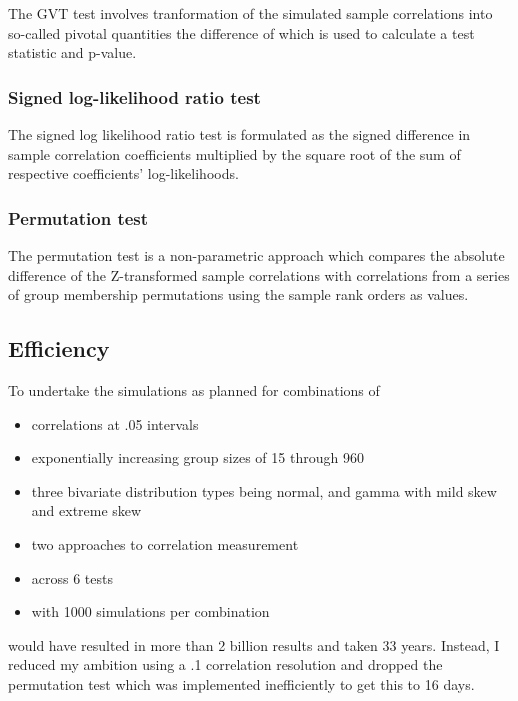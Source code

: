 The GVT test involves tranformation of the simulated sample correlations into so-called pivotal quantities the difference of which is used to calculate a test statistic and p-value.


\subsubsection{Signed log-likelihood ratio test}
The signed log likelihood ratio test is formulated as the signed difference in sample correlation coefficients multiplied by the square root of the sum of respective coefficients' log-likelihoods.


\subsubsection{Permutation test}
The permutation test is a non-parametric approach which compares the absolute difference of the Z-transformed sample correlations with correlations from a series of group membership permutations using the sample rank orders as values.

\subsection{Efficiency}
To undertake the simulations as planned for combinations of 
\begin{itemize}
  \item correlations at .05 intervals 
  \item exponentially increasing group sizes of 15 through 960
  \item three bivariate distribution types being normal, and gamma with mild skew and extreme skew
  \item two approaches to correlation measurement 
  \item across 6 tests
  \item with 1000 simulations per combination 
\end{itemize}
would have resulted in more than 2 billion results and taken 33 years.  Instead, I reduced my ambition using a .1 correlation resolution and dropped the permutation test which was implemented inefficiently to get this to 16 days.
  


